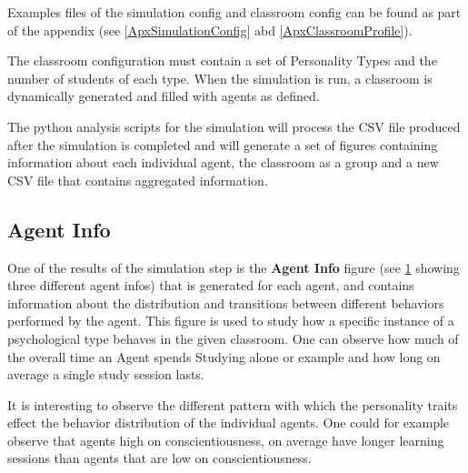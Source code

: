 Examples files of the simulation config and classroom config can be found as part of
the appendix (see \ref{ApxSimulationConfig} abd \ref{ApxClassroomProfile}).

The classroom configuration must contain a set of Personality Types and the number
of students of each type. When the simulation is run, a classroom is dynamically
generated and filled with agents as defined.

The python analysis scripts for the simulation will process the CSV file produced
after the simulation is completed and will generate a set of figures containing information
about each individual agent, the classroom as a group and a new CSV file that contains
aggregated information.

\subsection{Agent Info}
One of the results of the simulation step is the \textbf{Agent Info} figure (see \ref{AgentInfo} showing
three different agent infos) that is generated for each agent, and contains information
about the distribution and transitions between different behaviors performed by the agent.
This figure is used to study how a specific instance of a psychological type behaves
in the given classroom. One can observe how much of the overall time an Agent
spends Studying alone or example and how long on average a single study session lasts.

\bb

It is interesting to observe the different pattern with which the personality traits
effect the behavior distribution of the individual agents. One could for example
observe that agents high on conscientiousness, on average have longer
learning sessions than agents that are low on conscientiousness.

\begin{figure}[H]
    \label{AgentInfo}
    \hspace*{-2.0\leftmargin}
\end{figure}


